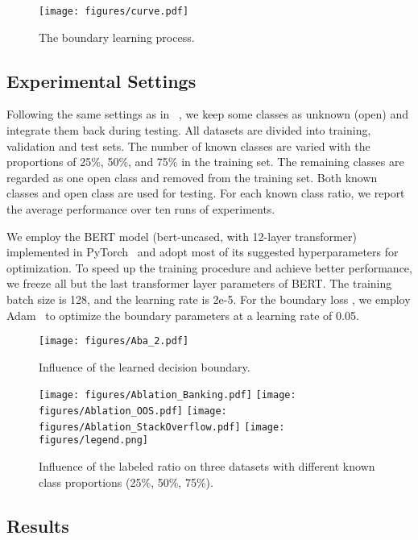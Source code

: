 \documentclass[letterpaper]{article} \usepackage{aaai21}  \usepackage{times}  \usepackage{helvet} \usepackage{courier}  \usepackage[hyphens]{url}  \usepackage{graphicx} \urlstyle{rm} \def\UrlFont{\rm}  \usepackage{natbib}  \usepackage{caption} \frenchspacing  \setlength{\pdfpagewidth}{8.5in}  \setlength{\pdfpageheight}{11in}  \usepackage{amsmath}
\begin{document}
	\begin{figure}
		\centering  
		\texttt{[image: figures/curve.pdf]}
		\caption{The boundary learning process.}
		\label{Aba_2_1}
	\end{figure}
	
	\subsection{Experimental Settings}
	Following the same settings as in ~\citep{Shu2017DOCDO,lin-xu-2019-deep}, we keep some classes as unknown (open) and integrate them back during testing. All datasets are divided into training, validation and test sets. The number of known classes are varied with the proportions of 25\%, 50\%, and 75\% in the training set. The remaining classes are regarded as one open class and removed from the training set. Both known classes and open class are used for testing. For each known class ratio, we report the average performance over ten runs of experiments.  
	
	We employ the BERT model (bert-uncased, with 12-layer transformer) implemented in PyTorch~\cite{Wolf2019HuggingFacesTS} and adopt most of its suggested hyperparameters for optimization. To speed up the training procedure and achieve better performance, we freeze all but the last transformer layer parameters of BERT. The training batch size is 128, and the learning rate is 2e-5.  For the boundary loss , we employ Adam~\citep{kingma2014adam} to optimize the boundary parameters at a learning rate of 0.05.
	
	\begin{figure}
		\centering  
		\texttt{[image: figures/Aba\_2.pdf]}
		\caption{ Influence of the learned 	decision boundary.}
		\label{Aba_2_2}
	\end{figure}
	\begin{figure*}[!t]
		\centering  
		\texttt{[image: figures/Ablation\_Banking.pdf]}
		\texttt{[image: figures/Ablation\_OOS.pdf]}
		\texttt{[image: figures/Ablation\_StackOverflow.pdf]}
		\texttt{[image: figures/legend.png]}
		\caption{ Influence of the labeled ratio on three datasets with different known class proportions (25\%, 50\%, 75\%).}
		\label{Aba_3}
	\end{figure*}
	
	\subsection{Results}
	
\end{document}
